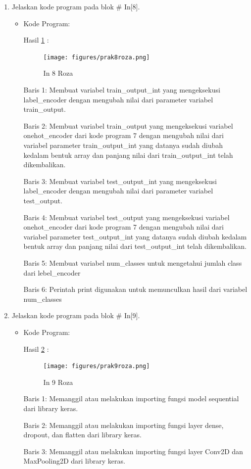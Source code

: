 \begin{enumerate}
\item Jelaskan kode program pada blok \# In[8].
\begin{itemize}
\item Kode Program:

\par Hasil \ref{in8roza} :
\begin{figure}[!hbtp]
\centering
\texttt{[image: figures/prak8roza.png]}
\caption{In 8 Roza}
\label{in8roza}
\end{figure}
\par Baris 1: Membuat variabel train\_output\_int yang mengeksekusi label\_encoder dengan mengubah nilai dari parameter variabel train\_output.
\par Baris 2: Membuat variabel train\_output yang mengeksekusi variabel onehot\_encoder dari kode program 7 dengan mengubah nilai dari variabel parameter train\_output\_int yang datanya sudah diubah kedalam bentuk array dan panjang nilai dari train\_output\_int telah dikembalikan.
\par Baris 3: Membuat variabel test\_output\_int yang mengeksekusi label\_encoder dengan mengubah nilai dari parameter variabel test\_output.
\par Baris 4: Membuat variabel test\_output yang mengeksekusi variabel onehot\_encoder dari kode program 7 dengan mengubah nilai dari variabel parameter test\_output\_int yang datanya sudah diubah kedalam bentuk array dan panjang nilai dari test\_output\_int telah dikembalikan.
\par Baris 5: Membuat variabel num\_classes untuk mengetahui jumlah class dari lebel\_encoder
\par Baris 6: Perintah print digunakan untuk memunculkan hasil dari variabel num\_classes
\end{itemize}
\par

\item Jelaskan kode program pada blok \# In[9].
\begin{itemize}
\item Kode Program:

\par Hasil \ref{in9roza} :
\begin{figure}[!hbtp]
\centering
\texttt{[image: figures/prak9roza.png]}
\caption{In 9 Roza}
\label{in9roza}
\end{figure}
\par Baris 1: Memanggil atau melakukan importing fungsi model sequential dari library keras.
\par Baris 2: Memanggil atau melakukan importing fungsi layer dense, dropout, dan flatten dari library keras.
\par Baris 3: Memanggil atau melakukan importing fungsi layer Conv2D dan MaxPooling2D dari library keras.
\end{itemize}
\par


\end{enumerate}
